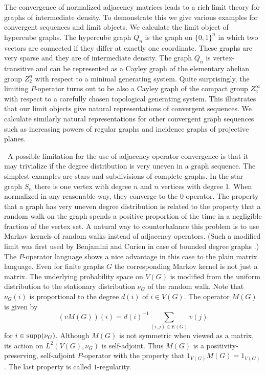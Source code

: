 \documentclass[a4wider]{amsart}
\theoremstyle{definitionbreak}\newtheorem{D}[theorem]{Definition}
\theoremstyle{definitionbreak}\newtheorem*{D*}{Definition}
\begin{document}
The convergence of normalized adjacency matrices leads to a rich limit theory for graphs of intermediate density. To demonstrate this we give various examples for convergent sequences and limit objects. We calculate the limit object of hypercube graphs. The hypercube graph $Q_n$ is the graph on $\{0,1\}^n$ in which two vectors are connected if they differ at exactly one coordinate. These graphs are very sparse and they are of intermediate density. The graph $Q_n$ is vertex-transitive and can be represented as a Cayley graph of the elementary abelian group $Z_2^n$ with respect to a minimal generating system. Quite surprisingly, the limiting $P$-operator turns out to be also a Cayley graph of the compact group $Z_2^\infty$ with respect to a carefully chosen topological generating system. This illustrates that our limit objects give natural representations of convergent sequences. We calculate similarly natural representations for other convergent graph sequences such as increasing powers of regular graphs and incidence graphs of projective planes.



~A possible limitation for the use of adjacency operator convergence is that it may trivialize if the degree distribution is very uneven in a graph sequence. The simplest examples are stars and subdivisions of complete graphs. In the star graph $S_n$ there is one vertex with degree $n$ and $n$ vertices with degree $1$. When normalized in any reasonable way, they converge to the $0$ operator. The property that a graph has very uneven degree distribution is related to the property that a random walk on the graph spends a positive proportion of the time in a negligible fraction of the vertex set. A natural way to counterbalance this problem is to use Markov kernels of random walks  instead of adjacency operators. (Such a modified limit was first used by Benjamini and Curien in case of bounded degree graphs \cite{curien}.) The $P$-operator language shows a nice advantage in this case to the plain matrix language. Even for finite graphs $G$ the corresponding Markov kernel is not just a matrix. The underlying probability space on $V(G)$ is modified from the uniform distribution to the stationary distribution $\nu_G$ of the random walk. Note that $\nu_G(i)$ is proportional to the degree $d(i)$ of $i\in V(G)$. The operator $M(G)$ is given by 
\begin{equation}\label{eq:vmg}(vM(G))(i)=d(i)^{-1}\sum_{(i,j)\in E(G)} v(j)\end{equation} for $i\in{\rm supp}(\nu_G)$. Although $M(G)$ is not symmetric when viewed as a matrix, its action on $L^2(V(G),\nu_G)$ is self-adjoint. Thus $M(G)$ is a positivity-preserving, self-adjoint $P$-operator with the property that $1_{V(G)}M(G)=1_{V(G)}$. The last property is called $1$-regularity.
\end{document}
